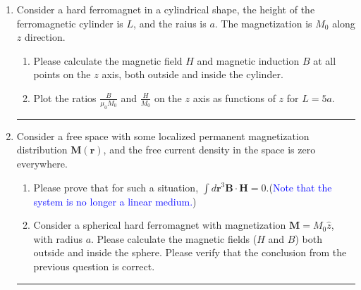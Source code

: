 \documentclass[a4paper,9pt]{article}
\begin{document}
\begin{enumerate}
  \item Consider a hard ferromagnet in a cylindrical shape, the height of the ferromagnetic cylinder is $L$, and the raius is $a$. The magnetization is $M_0$ along $z$ direction.
  \begin{enumerate}
    \item Please calculate the magnetic field $H$ and magnetic induction $B$ at all points on the $z$ axis, both outside and inside the cylinder.
    \item Plot the ratios $\frac{B}{\mu_0M_0}$ and $\frac{H}{M_0}$ on the $z$ axis as functions of $z$ for $L=5a$.
  \end{enumerate}
  \rule[0pt]{6cm}{0.05em}
  \item Consider a free space with some localized permanent magnetization distribution $\boldsymbol{M}(\boldsymbol{r})$, and the free current density in the space is zero everywhere.
  \begin{enumerate}
    \item Please prove that for such a situation, $\int d\boldsymbol{r}^3\boldsymbol{B}\cdot\boldsymbol{H}=0$.(\textcolor{blue}{Note that the system is no longer a linear medium.})
    \item Consider a spherical hard ferromagnet with magnetization $\boldsymbol{M}=M_0\hat{z}$, with radius $a$. Please calculate the magnetic fields ($H$ and $B$) both outside and inside the sphere. Please verify that the conclusion from the previous question is correct.
  \end{enumerate}
  \rule[0pt]{6cm}{0.05em}
\end{enumerate}
\end{document}
